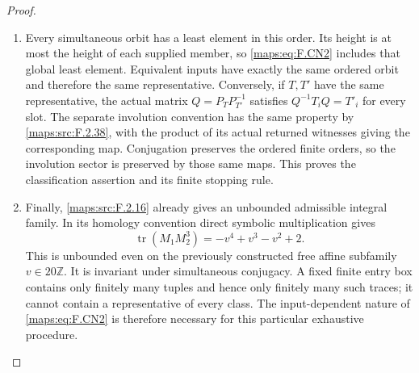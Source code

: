 \documentclass[11pt,a4paper]{article}
\theoremstyle{definition}
\begin{document}
\begin{proof}
\begin{enumerate}[label=\arabic*.]
\item Every simultaneous orbit has a least element in this order.
Its height is at most the height of each supplied member, so
\eqref{maps:eq:F.CN2} includes that global least element.
Equivalent inputs have exactly the same ordered orbit and
therefore the same representative. Conversely, if $T,T'$ have
the same representative, the actual matrix
$Q=P_TP_{T'}^{-1}$ satisfies $Q^{-1}T_iQ=T'_i$ for every slot.
The separate involution convention has the same property by
\cref{maps:src:F.2.38}, with the product of its actual returned
witnesses giving the corresponding map. Conjugation preserves
the ordered finite orders, so the involution sector is preserved
by those same maps. This proves the classification assertion
and its finite stopping rule.

\item Finally, \ref{maps:src:F.2.16} already gives an unbounded admissible integral
family. In its homology convention direct symbolic
multiplication gives
\[
             \operatorname{tr}(M_1M_2^3)
                       =-v^4+v^3-v^2+2.                 \tag{F.CN3}\label{maps:eq:F.CN3}
\]
This is unbounded even on the previously constructed free
affine subfamily $v\in20\mathbb Z$. It is invariant under
simultaneous conjugacy. A fixed finite entry box contains
only finitely many tuples and hence only finitely many such
traces; it cannot contain a representative of every class.
The input-dependent nature of \eqref{maps:eq:F.CN2} is therefore necessary
for this particular exhaustive procedure.

\end{enumerate}
\end{proof}
\end{document}
